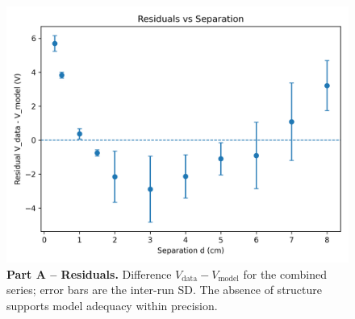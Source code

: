 \documentclass[12pt]{article}
\begin{document}
\begin{figure}[htbp]
\centering
\includegraphics[width=0.82\linewidth]{PartA_residuals.png}
\caption{\textbf{Part A -- Residuals.} Difference \(V_{\text{data}}-V_{\text{model}}\) for the combined series; error bars are the inter-run SD. The absence of structure supports model adequacy within precision.}
\label{fig:resid}
\end{figure}
\end{document}
